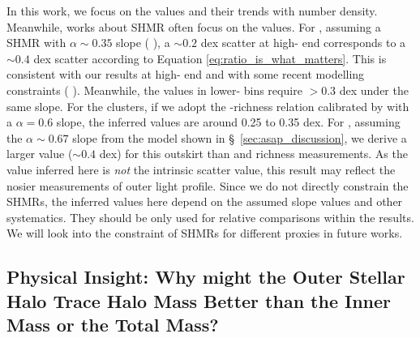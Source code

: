 \documentclass[fleqn,usenatbib,useAMS]{mnras}
\begin{document}
\begin{CJK*}{UTF8}{gbsn}
    In this work, we focus on the \sigmvir{} values and their trends with number density. 
    Meanwhile, works about SHMR often focus on the \sigms{} values.
    For , assuming a SHMR with $\alpha \sim 0.35$ slope (\eg{} \citealt{GoldenMarx2019,
    Huang2020}), a \sigms{}$\sim 0.2$ dex scatter at high-\mvir{} end corresponds to a 
    \sigmvir{}$\sim 0.4$ dex scatter according to Equation \ref{eq:ratio_is_what_matters}.
    This is consistent with our results at high-\mvir{} end and with some recent modelling
    constraints (\eg{} \citealt{Kravtsov2018, Behroozi2018}). 
    Meanwhile, the \sigmvir{} values in lower-\mvir{} bins require \sigms{}$>0.3$ dex under the 
    same slope. 
    For the \camira{} clusters, if we adopt the \mvir{}-richness relation calibrated by 
    \citet{Murata2019} with a $\alpha = 0.6$ slope, the inferred \sigms{} values are around 
    0.25 to 0.35 dex. 
    For , assuming the $\alpha \sim 0.67$ slope from the \asap{} model shown
    in \S\ \ref{sec:asap_discussion}, we derive a larger \sigms{} value ($\sim 0.4$ dex) for this
    outskirt \mstar{} than  and richness measurements. 
    As the \sigms{} value inferred here is \emph{not} the intrinsic scatter value, this result 
    may reflect the nosier measurements of outer light profile.
    Since we do not directly constrain the SHMRs, the inferred \sigms{} values here depend on the
    assumed slope values and other systematics.
    They should be only used for relative comparisons within the \topn{} results.
    We will look into the constraint of SHMRs for different \mvir{} proxies in future works.
    

\subsection{Physical Insight: Why might the Outer Stellar Halo Trace Halo Mass Better than the Inner
    Mass or the Total Mass?}
    \label{sec:outskirt_discussion}


\end{CJK*}
\end{document}
